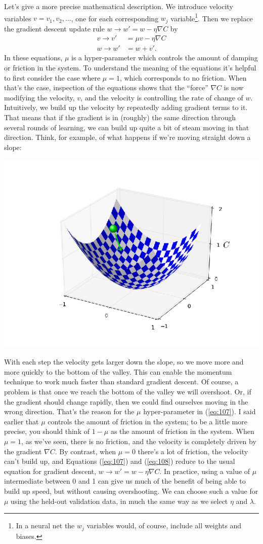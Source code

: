 \documentclass[a4paper,twoside,10pt]{book}
\begin{document}
Let's give a more precise mathematical description. We introduce velocity variables $v=v_1,v_2,\ldots$, one for each corresponding $w_j$ variable\footnote{In a neural net the $w_j$ variables would, of course, include all weights and biases.}. Then we replace the gradient descent update rule $w \to w'= w-\eta \nabla C$ by
\begin{align} 
v  \to   v' &=  \mu v - \eta \nabla C \label{eq:107}\\
w  \to  w' &=  w  + v'.\label{eq:108}
\end{align}
In these equations, $\mu$ is a hyper-parameter which controls the amount of damping or friction in the system. To understand the meaning of the equations it's helpful to first consider the case where $\mu=1$, which corresponds to no friction. When that's the case, inspection of the equations shows that the ``force'' $\nabla C$ is now modifying the velocity, $v$, and the velocity is controlling the rate of change of $w$. Intuitively, we build up the velocity by repeatedly adding gradient terms to it. That means that if the gradient is in (roughly) the same direction through several rounds of learning, we can build up quite a bit of steam moving in that direction. Think, for example, of what happens if we're moving straight down a slope:
\begin{center}
	\includegraphics[width=0.55\linewidth]{figures/ch3/tikz34}
\end{center}
With each step the velocity gets larger down the slope, so we move more and more quickly to the bottom of the valley. This can enable the momentum technique to work much faster than standard gradient descent. Of course, a problem is that once we reach the bottom of the valley we will overshoot. Or, if the gradient should change rapidly, then we could find ourselves moving in the wrong direction. That's the reason for the $\mu$ hyper-parameter in (\ref{eq:107}). I said earlier that $\mu$ controls the amount of friction in the system; to be a little more precise, you should think of $1-\mu$ as the amount of friction in the system. When $\mu=1$, as we've seen, there is no friction, and the velocity is completely driven by the gradient $\nabla C$. By contrast, when $\mu=0$ there's a lot of friction, the velocity can't build up, and Equations (\ref{eq:107}) and (\ref{eq:108}) reduce to the usual equation for gradient descent, $w \to w'=w-\eta \nabla C$. In practice, using a value of $\mu$ intermediate between 0 and 1 can give us much of the benefit of being able to build up speed, but without causing overshooting. We can choose such a value for $\mu$ using the held-out validation data, in much the same way as we select $\eta$ and $\lambda$.
\end{document}
